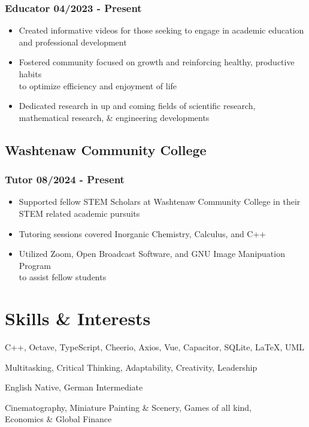 \documentclass[10pt]{article} %
\begin{document}
\subsubsection{Educator \hfill 04/2023 - Present}
\begin{itemize}
    \item {Created informative videos for those seeking to engage in academic 
        education \\ and professional development}
    \item {Fostered community focused on growth and reinforcing healthy, 
        productive habits \\ to optimize efficiency and enjoyment of life}
    \item {Dedicated research in up and coming fields of scientific research, \\ 
        mathematical research, \& engineering developments}
\end{itemize}  

\subsection{Washtenaw Community College}
\subsubsection{Tutor \hfill 08/2024 - Present}
\begin{itemize}
    \item {Supported fellow STEM Scholars at Washtenaw Community College in their
        \\ STEM related academic pursuits}
    \item {Tutoring sessions covered Inorganic Chemistry, Calculus, and C++}
    \item {Utilized Zoom, Open Broadcast Software, and GNU Image Manipuation Program
        \\ to assist fellow students}
\end{itemize}

\section{Skills \& Interests}
\begin{description}[style=multiline, leftmargin=2.75cm]
    \item[Technical] {C++, Octave, TypeScript, Cheerio, Axios, Vue, Capacitor, SQLite, 
        LaTeX, UML}
    \item[Soft] Multitasking, Critical Thinking, Adaptability, Creativity, Leadership 
    \item[Languages] English Native, German Intermediate
    \item[Interests] {Cinematography, Miniature Painting \& Scenery, 
        Games of all kind, \\ Economics \& Global Finance}
\end{description}
\end{document}
